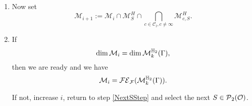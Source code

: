 \begin{algo}
\begin{enumerate}
\item
Now set
\[ \mathcal{M}_{i+1} := \mathcal{M}_i \cap \mathcal{M}^H_S \cap \bigcap_{c \in \mathcal{C}_l, c \ne \infty} \mathcal{M}^H_{c,S} . \]
%
%
%
%
%

\item
If
\[ \dim \mathcal{M}_i = \dim \operatorname{\mathcal{M}}^{\mathbb{H}_{2}}_{k} (\Gamma) , \]
then we are ready and we have
\[ \mathcal{M}_i = \mathcal{FE}_{\mathcal{F}}(\operatorname{\mathcal{M}}^{\mathbb{H}_{2}}_{k} (\Gamma)) . \]

If not, increase $i$, return to step \ref{NextSStep} and select the next $S \in \operatorname{\mathcal{P}}_2(\mathcal{O})$.
\end{enumerate}
\end{algo}

